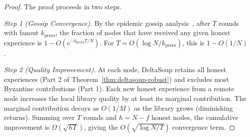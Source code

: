 \begin{proof}
The proof proceeds in two steps.

\textit{Step 1 (Gossip Convergence).}
By the epidemic gossip analysis~\cite{demers1987epidemic}, after $T$ rounds
with fanout $k_{\text{peers}}$, the fraction of nodes that have received any
given honest experience is $1 - O(e^{-k_{\text{peers}} T / N})$. For $T =
O(\log N / k_{\text{peers}})$, this is $1 - O(1/N)$.

\textit{Step 2 (Quality Improvement).}
At each node, DeltaSoup retains all honest experiences (Part 2 of
Theorem~\ref{thm:deltasoup-robust}) and excludes most Byzantine contributions
(Part 1). Each new honest experience from a remote node increases the local
library quality by at least its marginal contribution. The marginal contribution
decays as $O(1/M)$ as the library grows (diminishing returns). Summing over $T$
rounds and $h = N - f$ honest nodes, the cumulative improvement is
$\Omega(\sqrt{hT})$, giving the $O(\sqrt{\log N / T})$ convergence term.
\end{proof}

